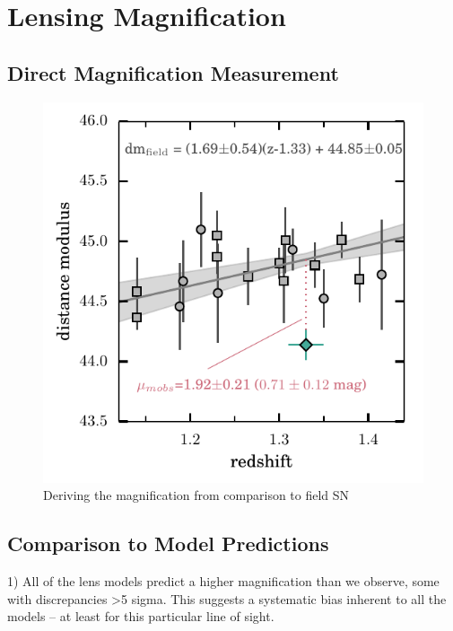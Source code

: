 \section{Lensing Magnification}
\label{sec:LensingMagnification}


\subsection{Direct Magnification Measurement}
\label{sec:DirectMagnificationMeasurement}


\begin{figure}
\begin{center}
\includegraphics[width=\columnwidth]{FIG/magnification_measurement}
\caption{ Deriving the magnification from comparison to field SN
\label{fig:magmeasure} }
\end{center}
\end{figure}

\subsection{Comparison to Model Predictions}
\label{sec:ComparisonToModelPredictions}


1) All of the lens models predict a higher magnification than we observe, some with discrepancies >5 sigma.  This suggests a systematic bias inherent to all the models -- at least for this particular line of sight. 

